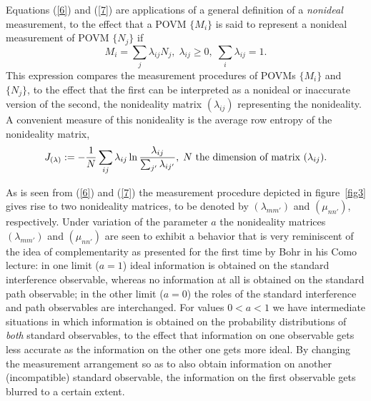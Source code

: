 \documentclass{ws-procs975x65}
\begin{document}
{Equations (\ref{6}) and (\ref{7}) are applications of a general
definition of a \textit{nonideal} measurement\cite{MadM90}, to the
effect that a POVM $\{M_{i}\}$ is said to represent a nonideal
measurement of POVM $\{N_{j}\}$ if \[
 M_{i} = \sum_{j} \lambda_{ij} N_{j},\;
\lambda_{ij} \geq 0,\;\sum_{i} \lambda_{ij} = 1.\]
 This expression compares the measurement procedures of POVMs
 $\{M_i\}$ and $\{N_j\}$, to the effect that the first can be
 interpreted as a nonideal or inaccurate version of the second,
the nonideality matrix $(\lambda_{ij})$ representing the
nonideality.  A convenient measure of this nonideality is the
average row entropy of the nonideality matrix,
\begin{equation}\label{17}
J_{(\lambda)} := - \frac{1}{N} \sum_{ij} \lambda_{ij} \ln
\frac{\lambda_{ij}} {\sum_{j'} \lambda_{ij'}},\; N \mbox{ \rm the
dimension of matrix }(\lambda_{ij}).\end{equation}

 As is seen from (\ref{6}) and (\ref{7}) the measurement procedure
 depicted in figure~\ref{fig3} gives rise to two nonideality
 matrices, to be denoted by $(\lambda_{mm'})$ and $(\mu_{nn'})$,
 respectively. Under variation of the parameter $a$ the nonideality
 matrices $(\lambda_{mm'})$ and $(\mu_{nn'})$ are seen to
 exhibit a behavior that is very reminiscent of the idea of
complementarity as presented for the first time by Bohr in his
Como lecture\cite{Bohr27}: in one limit ($a=1$) ideal information
is obtained on the standard interference observable, whereas no
information at all is obtained on the standard path observable; in
the other limit ($a=0$) the roles of the standard interference and
path observables are interchanged. For values $0<a<1$ we have
intermediate situations in which information is obtained on the
probability distributions of \textit{both} standard observables,
to the effect that information on one observable gets less
accurate as the information on the other one gets more ideal. By
changing the measurement arrangement so as to also obtain
information on another (incompatible) standard observable, the
information on the first observable gets blurred to a certain
extent.

}
\end{document}
